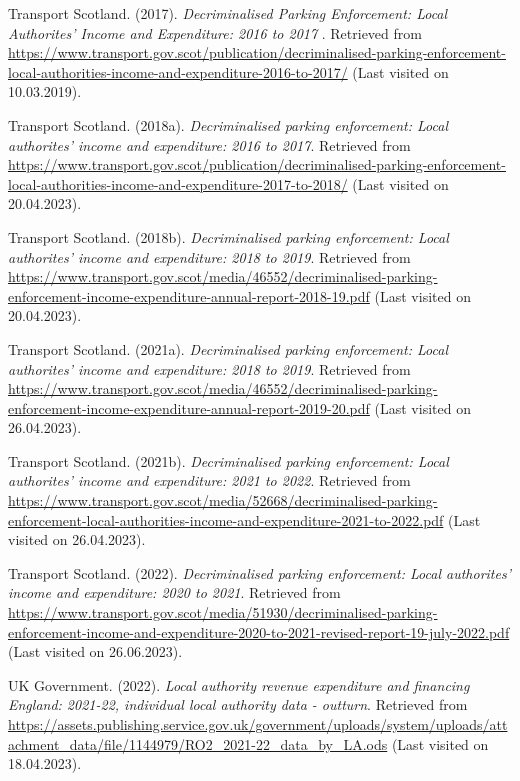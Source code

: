 \documentclass[
  12pt,
]{article}
\newlength{\cslhangindent}
\newlength{\cslentryspacingunit} %
\newenvironment{CSLReferences}[2] %
 {%
  \setlength{\parindent}{0pt}
  \ifodd #1
  \let\oldpar\par
  \def\par{\hangindent=\cslhangindent\oldpar}
  \fi
  \setlength{\parskip}{#2\cslentryspacingunit}
 }%
 {}
\begin{document}
\begin{CSLReferences}{1}{0}
\leavevmode{}%
Transport Scotland. (2017). \emph{{Decriminalised Parking Enforcement: Local Authorites' Income and Expenditure: 2016 to 2017 }}. Retrieved from \url{https://www.transport.gov.scot/publication/decriminalised-parking-enforcement-local-authorities-income-and-expenditure-2016-to-2017/} (Last visited on 10.03.2019).

\leavevmode{}%
Transport Scotland. (2018a). \emph{Decriminalised parking enforcement: Local authorites' income and expenditure: 2016 to 2017}. Retrieved from \url{https://www.transport.gov.scot/publication/decriminalised-parking-enforcement-local-authorities-income-and-expenditure-2017-to-2018/} (Last visited on 20.04.2023).

\leavevmode{}%
Transport Scotland. (2018b). \emph{Decriminalised parking enforcement: Local authorites' income and expenditure: 2018 to 2019}. Retrieved from \url{https://www.transport.gov.scot/media/46552/decriminalised-parking-enforcement-income-expenditure-annual-report-2018-19.pdf} (Last visited on 20.04.2023).

\leavevmode{}%
Transport Scotland. (2021a). \emph{Decriminalised parking enforcement: Local authorites' income and expenditure: 2018 to 2019}. Retrieved from \url{https://www.transport.gov.scot/media/46552/decriminalised-parking-enforcement-income-expenditure-annual-report-2019-20.pdf} (Last visited on 26.04.2023).

\leavevmode{}%
Transport Scotland. (2021b). \emph{Decriminalised parking enforcement: Local authorites' income and expenditure: 2021 to 2022}. Retrieved from \url{https://www.transport.gov.scot/media/52668/decriminalised-parking-enforcement-local-authorities-income-and-expenditure-2021-to-2022.pdf} (Last visited on 26.04.2023).

\leavevmode{}%
Transport Scotland. (2022). \emph{Decriminalised parking enforcement: Local authorites' income and expenditure: 2020 to 2021}. Retrieved from \url{https://www.transport.gov.scot/media/51930/decriminalised-parking-enforcement-income-and-expenditure-2020-to-2021-revised-report-19-july-2022.pdf} (Last visited on 26.06.2023).

\leavevmode{}%
UK Government. (2022). \emph{{Local authority revenue expenditure and financing England: 2021-22, individual local authority data - outturn}}. Retrieved from \url{https://assets.publishing.service.gov.uk/government/uploads/system/uploads/attachment_data/file/1144979/RO2_2021-22_data_by_LA.ods} (Last visited on 18.04.2023).


\end{CSLReferences}
\end{document}
